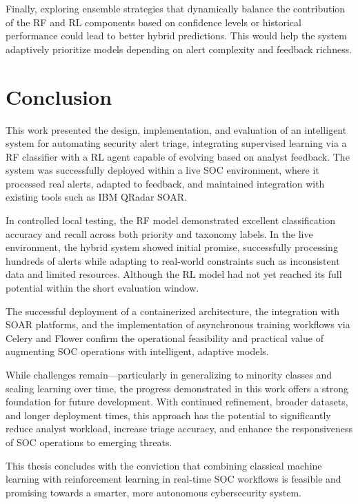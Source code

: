 Finally, exploring ensemble strategies that dynamically balance the contribution of the RF and RL components based on confidence levels or historical performance could lead to better hybrid predictions. 
This would help the system adaptively prioritize models depending on alert complexity and feedback richness.

\section{Conclusion}

This work presented the design, implementation, and evaluation of an intelligent system for automating security alert triage, integrating supervised learning via a RF classifier with a RL agent capable of evolving based on analyst feedback. 
The system was successfully deployed within a live SOC environment, where it processed real alerts, adapted to feedback, and maintained integration with existing tools such as IBM QRadar SOAR.

In controlled local testing, the RF model demonstrated excellent classification accuracy and recall across both priority and taxonomy labels. 
In the live environment, the hybrid system showed initial promise, successfully processing hundreds of alerts while adapting to real-world constraints such as inconsistent data and limited resources. 
Although the RL model had not yet reached its full potential within the short evaluation window.

The successful deployment of a containerized architecture, the integration with SOAR platforms, and the implementation of asynchronous training workflows via Celery and Flower confirm the operational feasibility and practical value of augmenting SOC operations with intelligent, adaptive models.

While challenges remain—particularly in generalizing to minority classes and scaling learning over time, the progress demonstrated in this work offers a strong foundation for future development. With continued refinement, broader datasets, and longer deployment times, this approach has the potential to significantly reduce analyst workload, increase triage accuracy, and enhance the responsiveness of SOC operations to emerging threats.

This thesis concludes with the conviction that combining classical machine learning with reinforcement learning in real-time SOC workflows is feasible and promising towards a smarter, more autonomous cybersecurity system.

